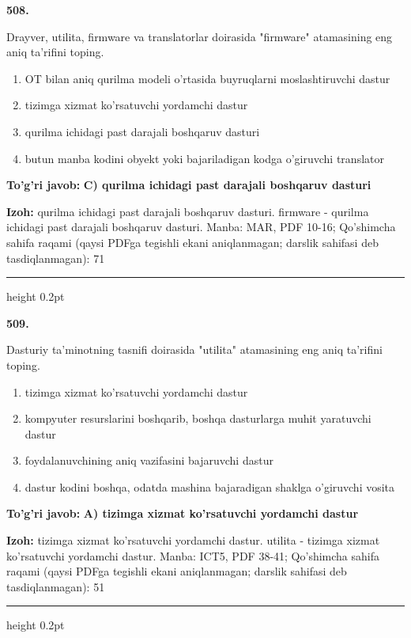 \documentclass[10pt,a4paper]{article}
\begin{document}
{\bfseries\sffamily\color{ink} 508.}
\par
Drayver, utilita, firmware va translatorlar doirasida "firmware" atamasining eng aniq ta'rifini toping.
\begin{enumerate}[label=\Alph*),leftmargin=9mm]
\item OT bilan aniq qurilma modeli o'rtasida buyruqlarni moslashtiruvchi dastur
\item tizimga xizmat ko'rsatuvchi yordamchi dastur
\item qurilma ichidagi past darajali boshqaruv dasturi
\item butun manba kodini obyekt yoki bajariladigan kodga o'giruvchi translator
\end{enumerate}
\begin{tcolorbox}[enhanced,breakable,colback=teal!4,colframe=teal!60!black,boxrule=0.45pt,arc=1.2mm,left=2.7mm,right=2.7mm,top=1.8mm,bottom=1.8mm,before skip=2mm,after skip=2mm]
{\bfseries\sffamily\color{teal}To'g'ri javob:} \textbf{C) qurilma ichidagi past darajali boshqaruv dasturi}
\par\smallskip
{\bfseries Izoh:} qurilma ichidagi past darajali boshqaruv dasturi. firmware - qurilma ichidagi past darajali boshqaruv dasturi. Manba: MAR, PDF 10-16; Qo'shimcha sahifa raqami (qaysi PDFga tegishli ekani aniqlanmagan; darslik sahifasi deb tasdiqlanmagan): 71
\end{tcolorbox}
\vspace{2mm}\hrule height 0.2pt\vspace{3mm}

{\bfseries\sffamily\color{ink} 509.}
\par
Dasturiy ta'minotning tasnifi doirasida "utilita" atamasining eng aniq ta'rifini toping.
\begin{enumerate}[label=\Alph*),leftmargin=9mm]
\item tizimga xizmat ko'rsatuvchi yordamchi dastur
\item kompyuter resurslarini boshqarib, boshqa dasturlarga muhit yaratuvchi dastur
\item foydalanuvchining aniq vazifasini bajaruvchi dastur
\item dastur kodini boshqa, odatda mashina bajaradigan shaklga o'giruvchi vosita
\end{enumerate}
\begin{tcolorbox}[enhanced,breakable,colback=teal!4,colframe=teal!60!black,boxrule=0.45pt,arc=1.2mm,left=2.7mm,right=2.7mm,top=1.8mm,bottom=1.8mm,before skip=2mm,after skip=2mm]
{\bfseries\sffamily\color{teal}To'g'ri javob:} \textbf{A) tizimga xizmat ko'rsatuvchi yordamchi dastur}
\par\smallskip
{\bfseries Izoh:} tizimga xizmat ko'rsatuvchi yordamchi dastur. utilita - tizimga xizmat ko'rsatuvchi yordamchi dastur. Manba: ICT5, PDF 38-41; Qo'shimcha sahifa raqami (qaysi PDFga tegishli ekani aniqlanmagan; darslik sahifasi deb tasdiqlanmagan): 51
\end{tcolorbox}
\vspace{2mm}\hrule height 0.2pt\vspace{3mm}
\end{document}
